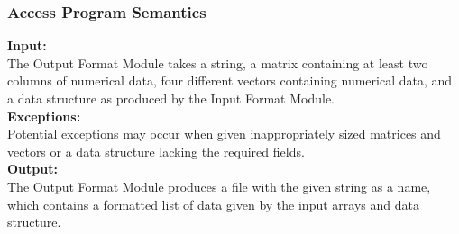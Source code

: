 \documentclass[12pt]{article}
\begin{document}
\subsubsection{Access Program Semantics}
\noindent \textbf{Input:}\\
The Output Format Module takes a string, a matrix containing at least two columns of numerical
data, four different vectors containing numerical data, and a data structure 
as produced by the Input Format Module.\\

\noindent \textbf{Exceptions:}\\
Potential exceptions may occur when given inappropriately sized
matrices and vectors or a data structure lacking the required fields.\\

\noindent \textbf{Output:}\\
The Output Format Module produces a file with the given string as a name, which contains a formatted list of data given by the input arrays and data structure.

\end{document}
